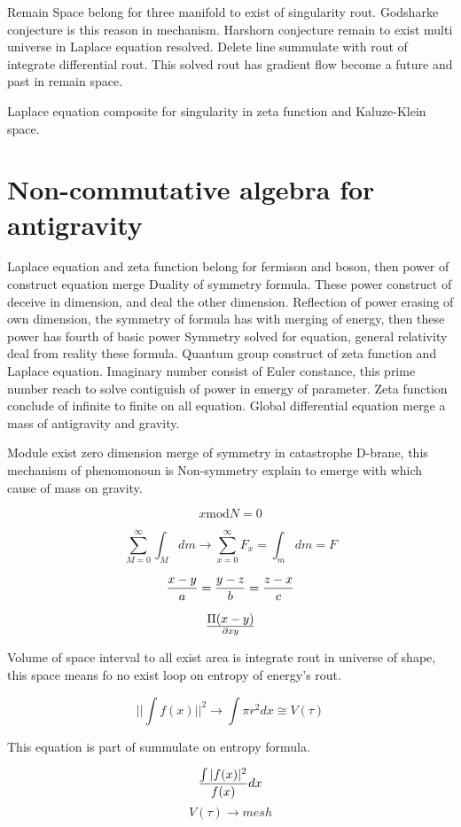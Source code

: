 \documentclass{jsarticle}
\begin{document}
  Remain Space belong for three manifold to exist of singularity rout. Godsharke conjecture is this reason in
mechanism. Harshorn conjecture remain to exist multi universe in Laplace equation resolved. Delete line summulate
with rout of integrate differential rout. This solved rout has gradient flow become a future and past in remain
space.


  Laplace equation composite for singularity in zeta function and Kaluze-Klein space.

\section{Non-commutative algebra for antigravity}

  Laplace equation and zeta function belong for fermison and boson, then power of construct equation merge
Duality of symmetry formula. These power construct of deceive in dimension, and deal the other dimension. Reflection
of power erasing of own dimension, the symmetry of formula has with merging of energy, then these power has fourth
of basic power Symmetry solved for equation, general relativity deal from reality these formula. Quantum group
construct of zeta function and Laplace equation. Imaginary number consist of Euler constance, this prime number
reach to solve contiguish of power in emergy of parameter. Zeta function conclude of infinite to finite on all
equation. Global differential equation merge a mass of antigravity and gravity.

  Module exist zero dimension merge of symmetry in catastrophe D-brane, this mechanism of phenomonoun
is Non-symmetry explain to emerge with which cause of mass on gravity.

$$x \mathrm{mod} N = 0 $$

$$ \sum^{\infty}_{M=0} \int_M dm \to \sum^{\infty}_{x=0} F_x = \int_m dm = F $$

$$ {x - y \over a } = {y - z \over b} = {z - x \over c} $$

$$ \Pi(x - y) \over \partial xy $$

  Volume of space interval to all exist area is integrate rout in universe of shape, this space means fo
no exist loop on entropy of energy's rout.

$$ || \int f(x) ||^2 \to \int \pi r^2 dx \cong V(\tau) $$

 This equation is part of summulate on entropy formula.

 $$ {\int |f(x)|^2 \over f(x)} dx $$
$$V(\tau) \to mesh $$
\end{document}
